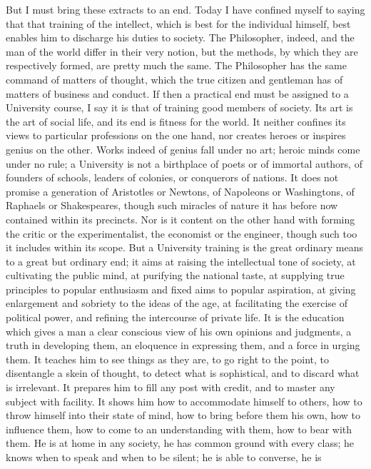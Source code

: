 But I must bring these extracts to an end. Today I have confined
myself to saying that that training of the intellect, which is best
for the individual himself, best enables him to discharge his duties
to society. The Philosopher, indeed, and the man of the world differ
in their very notion, but the methods, by which they are respectively
formed, are pretty much the same. The Philosopher has the same command
of matters of thought, which the true citizen and gentleman has of
matters of business and conduct. If then a practical end must be
assigned to a University course, I say it is that of training good
members of society. Its art is the art of social life, and its end is
fitness for the world. It neither confines its views to particular
professions on the one hand, nor creates heroes or inspires genius on
the other. Works indeed of genius fall under no art; heroic minds come
under no rule; a University is not a birthplace of poets or of
immortal authors, of founders of schools, leaders of colonies, or
conquerors of nations. It does not promise a generation of Aristotles
or Newtons, of Napoleons or Washingtons, of Raphaels or Shakespeares,
though such miracles of nature it has before now contained within its
precincts. Nor is it content on the other hand with forming the critic
or the experimentalist, the economist or the engineer, though such too
it includes within its scope. But a University training is the great
ordinary means to a great but ordinary end; it aims at raising the
intellectual tone of society, at cultivating the public mind, at
purifying the national taste, at supplying true principles to popular
enthusiasm and fixed aims to popular aspiration, at giving
enlargement and sobriety to the ideas of the age, at facilitating the
exercise of political power, and refining the intercourse of private
life. It is the education which gives a man a clear conscious view of
his own opinions and judgments, a truth in developing them, an
eloquence in expressing them, and a force in urging them. It teaches
him to see things as they are, to go right to the point, to
disentangle a skein of thought, to detect what is sophistical, and to
discard what is irrelevant. It prepares him to fill any post with
credit, and to master any subject with facility. It shows him how to
accommodate himself to others, how to throw himself into their state
of mind, how to bring before them his own, how to influence them, how
to come to an understanding with them, how to bear with them. He is at
home in any society, he has common ground with every class; he knows
when to speak and when to be silent; he is able to converse, he is
